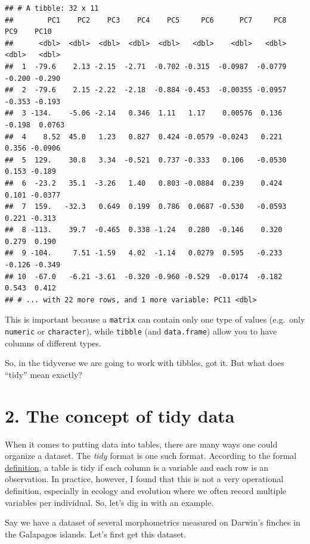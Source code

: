 \documentclass[]{book}
\begin{document}
\begin{verbatim}
## # A tibble: 32 x 11
##        PC1    PC2    PC3    PC4    PC5     PC6      PC7     PC8    PC9    PC10
##      <dbl>  <dbl>  <dbl>  <dbl>  <dbl>   <dbl>    <dbl>   <dbl>  <dbl>   <dbl>
##  1  -79.6    2.13 -2.15  -2.71  -0.702 -0.315  -0.0987  -0.0779 -0.200 -0.290 
##  2  -79.6    2.15 -2.22  -2.18  -0.884 -0.453  -0.00355 -0.0957 -0.353 -0.193 
##  3 -134.    -5.06 -2.14   0.346  1.11   1.17    0.00576  0.136  -0.198  0.0763
##  4    8.52  45.0   1.23   0.827  0.424 -0.0579 -0.0243   0.221   0.356 -0.0906
##  5  129.    30.8   3.34  -0.521  0.737 -0.333   0.106   -0.0530  0.153 -0.189 
##  6  -23.2   35.1  -3.26   1.40   0.803 -0.0884  0.239    0.424   0.101 -0.0377
##  7  159.   -32.3   0.649  0.199  0.786  0.0687 -0.530   -0.0593  0.221 -0.313 
##  8 -113.    39.7  -0.465  0.338 -1.24   0.280  -0.146    0.320   0.279  0.190 
##  9 -104.     7.51 -1.59   4.02  -1.14   0.0279  0.595   -0.233  -0.126 -0.349 
## 10  -67.0   -6.21 -3.61  -0.320 -0.960 -0.529  -0.0174  -0.182   0.543  0.412 
## # ... with 22 more rows, and 1 more variable: PC11 <dbl>
\end{verbatim}

This is important because a \texttt{matrix} can contain only one type of values (e.g.~only \texttt{numeric} or \texttt{character}), while \texttt{tibble} (and \texttt{data.frame}) allow you to have columns of different types.

So, in the tidyverse we are going to work with tibbles, got it. But what does ``tidy'' mean exactly?

\hypertarget{the-concept-of-tidy-data}{%
\section{2. The concept of tidy data}\label{the-concept-of-tidy-data}}

When it comes to putting data into tables, there are many ways one could organize a dataset. The \emph{tidy} format is one such format. According to the formal \href{https://tidyr.tidyverse.org/articles/tidy-data.html}{definition}, a table is tidy if each column is a variable and each row is an observation. In practice, however, I found that this is not a very operational definition, especially in ecology and evolution where we often record multiple variables per individual. So, let's dig in with an example.

Say we have a dataset of several morphometrics measured on Darwin's finches in the Galapagos islands. Let's first get this dataset.
\end{document}
